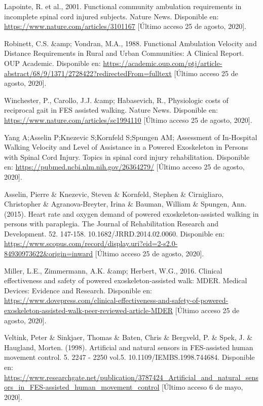 \begin{thebibliography}{99}
 Lapointe, R. et al., 2001. Functional community ambulation requirements in incomplete spinal cord injured subjects. Nature News. Disponible en: \url{https://www.nature.com/articles/3101167} [Último acceso 25 de agosto, 2020].

 Robinett, C.S. \&amp; Vondran, M.A., 1988. Functional Ambulation Velocity and Distance Requirements in Rural and Urban Communities: A Clinical Report. OUP Academic. Disponible en: \url{https://academic.oup.com/ptj/article-abstract/68/9/1371/2728422?redirectedFrom=fulltext} [Último acceso 25 de agosto, 2020].

 Winchester, P., Carollo, J.J. \&amp; Habasevich, R., Physiologic costs of reciprocal gait in FES assisted walking. Nature News. Disponible en: \url{https://www.nature.com/articles/sc1994110} [Último acceso 25 de agosto, 2020].

 Yang A;Asselin P;Knezevic S;Kornfeld S;Spungen AM; Assessment of In-Hospital Walking Velocity and Level of Assistance in a Powered Exoskeleton in Persons with Spinal Cord Injury. Topics in spinal cord injury rehabilitation. Disponible en: \url{https://pubmed.ncbi.nlm.nih.gov/26364279/} [Último acceso 25 de agosto, 2020].

 Asselin, Pierre \& Knezevic, Steven \& Kornfeld, Stephen \& Cirnigliaro, Christopher \& Agranova-Breyter, Irina \& Bauman, William \& Spungen, Ann. (2015). Heart rate and oxygen demand of powered exoskeleton-assisted walking in persons with paraplegia. The Journal of Rehabilitation Research and Development. 52. 147-158. 10.1682/JRRD.2014.02.0060. Disponible en: \url{https://www.scopus.com/record/display.uri?eid=2-s2.0-84930973622&origin=inward} [Último acceso 25 de agosto, 2020].

 Miller, L.E., Zimmermann, A.K. \&amp; Herbert, W.G., 2016. Clinical effectiveness and safety of powered exoskeleton-assisted walk: MDER. Medical Devices: Evidence and Research. Disponible en: \url{https://www.dovepress.com/clinical-effectiveness-and-safety-of-powered-exoskeleton-assisted-walk-peer-reviewed-article-MDER} [Último acceso 25 de agosto, 2020].

 Veltink, Peter \& Sinkjaer, Thomas \& Baten, Chris \& Bergveld, P. \& Spek, J. \& Haugland, Morten. (1998). Artificial and natural sensors in FES-assisted human movement control. 5. 2247 - 2250 vol.5. 10.1109/IEMBS.1998.744684. Disponible en: \url{https://www.researchgate.net/publication/3787424_Artificial_and_natural_sensors_in_FES-assisted_human_movement_control} [Último acceso 6 de mayo, 2020].


\end{thebibliography}
